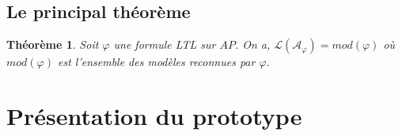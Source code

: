 \documentclass{beamer}
\theoremstyle{plain}
\newtheorem{thm}{Théorème}
\theoremstyle{definition}
\begin{document}
\subsection{Le principal théorème}
\begin{frame}
  \begin{thm}
    Soit $\varphi$ une formule LTL sur $AP$. On a, $\mathcal{L}(\mathcal{A}_\varphi)=mod(\varphi)$ où $mod(\varphi)$ est l'ensemble des modèles reconnues par $\varphi$.
  \end{thm}
\end{frame}


\section{Présentation du prototype}
\begin{frame}
  
\end{frame}
\end{document}
